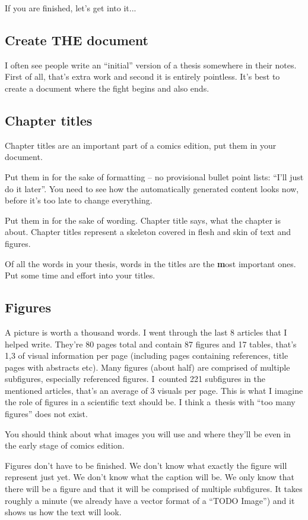 If you are finished, let's get into it...

\subsection*{Create THE document}

I often see people write an ``initial'' version of a thesis somewhere in their notes. First of all, that's extra work and second it is entirely pointless. It's best to create a document where the fight begins and also ends.

\subsection*{Chapter titles}

Chapter titles are an important part of a comics edition, put them in your document.

Put them in for the sake of formatting -- no provisional bullet point lists: ``I'll just do it later''. You need to see how the automatically generated content looks now, before it's too late to change everything.

Put them in for the sake of wording. Chapter title says, what the chapter is about. Chapter titles represent a skeleton covered in flesh and skin of text and figures.

Of all the words in your thesis, words in the titles are the \textbf most important ones\rm. Put some time and effort into your titles.

\subsection*{Figures}

A picture is worth a thousand words. I went through the last 8 articles that I helped write. They're 80 pages total and contain 87 figures and 17 tables, that's 1,3 of visual information per page (including pages containing references, title pages with abstracts etc). Many figures (about half) are comprised of multiple subfigures, especially referenced figures. I~counted 221 subfigures in the mentioned articles, that's an average of 3 visuals per page. This is what I imagine the role of figures in a scientific text should be. I think a~thesis with ``too many figures'' does not exist.

You should think about what images you will use and where they'll be even in the early stage of comics edition.

Figures don't have to be finished. We don't know what exactly the figure will represent just yet. We don't know what the caption will be. We only know that there will be a figure and that it will be comprised of multiple subfigures. It takes roughly a minute (we already have a vector format of a ``TODO Image'') and it shows us how the text will look.

